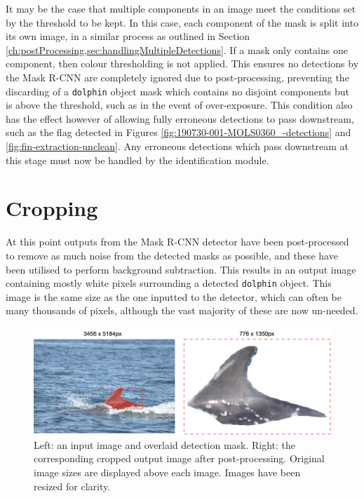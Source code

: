 It may be the case that multiple components in an image meet the conditions set by the threshold to be kept. In this case, each component of the mask is split into its own image, in a similar process as outlined in Section \ref{ch:postProcessing,sec:handlingMultipleDetections}. If a mask only contains one component, then colour thresholding is not applied. This ensures no detections by the Mask R-CNN are completely ignored due to post-processing, preventing the discarding of a \texttt{dolphin} object mask which contains no disjoint components but is above the threshold, such as in the event of over-exposure. This condition also has the effect however of allowing fully erroneous detections to pass downstream, such as the flag detected in Figures \ref{fig:190730-001-MOLS0360_-detections} and \ref{fig:fin-extraction-unclean}. Any erroneous detections which pass downstream at this stage must now be handled by the identification module.

\section{Cropping}\label{ch:cetDet,sec:postProcessing,su:cropping}

At this point outputs from the Mask R-CNN detector have been post-processed to remove as much noise from the detected masks as possible, and these have been utilised to perform background subtraction. This results in an output image containing mostly white pixels surrounding a detected \texttt{dolphin} object. This image is the same size as the one inputted to the detector, which can often be many thousands of pixels, although the vast majority of these are now un-needed.

\begin{figure}
	\begin{center}
		\includegraphics[scale=0.5]{Chapter5/figs/fin-extraction-unclean-updated.png}
	\end{center}
	\caption[Left: an input image and overlaid detection mask. Right: the corresponding cropped output image after post-processing.]{Left: an input image and overlaid detection mask. Right: the corresponding cropped output image after post-processing. Original image sizes are displayed above each image. Images have been resized for clarity.}\label{fig:190627-001-MOLS0028_-crop}
\end{figure}

